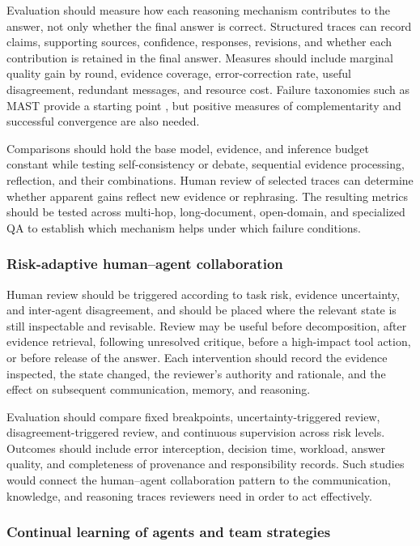 \documentclass[a4paper,fleqn]{cas-dc}
\begin{document}
Evaluation should measure how each reasoning mechanism contributes to the
answer, not only whether the final answer is correct. Structured traces can
record claims, supporting sources, confidence, responses, revisions, and
whether each contribution is retained in the final answer. Measures should
include marginal quality gain by round, evidence coverage, error-correction
rate, useful disagreement, redundant messages, and resource cost. Failure
taxonomies such as MAST provide a starting point
\citep{han2024mast}, but positive measures of complementarity and successful
convergence are also needed.

Comparisons should hold the base model, evidence, and inference budget
constant while testing self-consistency or debate, sequential evidence
processing, reflection, and their combinations. Human review of selected
traces can determine whether apparent gains reflect new evidence or
rephrasing. The resulting metrics should be tested across multi-hop,
long-document, open-domain, and specialized QA to establish which mechanism
helps under which failure conditions.

\subsubsection{Risk-adaptive human--agent collaboration}

Human review should be triggered according to task risk, evidence uncertainty,
and inter-agent disagreement, and should be placed where the relevant state is
still inspectable and revisable. Review may be useful before decomposition,
after evidence retrieval, following unresolved critique, before a high-impact
tool action, or before release of the answer. Each intervention should record
the evidence inspected, the state changed, the reviewer's authority and
rationale, and the effect on subsequent communication, memory, and reasoning.

Evaluation should compare fixed breakpoints, uncertainty-triggered review,
disagreement-triggered review, and continuous supervision across risk levels.
Outcomes should include error interception, decision time, workload, answer
quality, and completeness of provenance and responsibility records. Such
studies would connect the human--agent collaboration pattern to the
communication, knowledge, and reasoning traces reviewers need in order to
act effectively.

\subsubsection{Continual learning of agents and team strategies}
\end{document}
